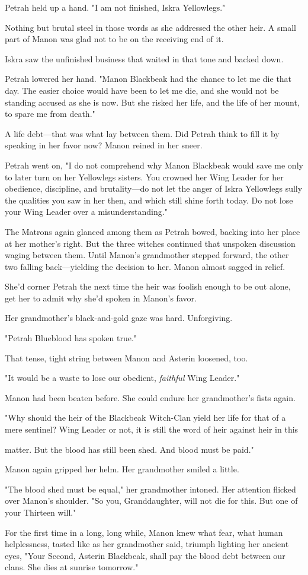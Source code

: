 Petrah held up a hand. "I am not finished, Iskra Yellowlegs."

Nothing but brutal steel in those words as she addressed the other heir. A small part of Manon was glad not to be on the receiving end of it.

Iskra saw the unfinished business that waited in that tone and backed down.

Petrah lowered her hand. "Manon Blackbeak had the chance to let me die that day. The easier choice would have been to let me die, and she would not be standing accused as she is now. But she risked her life, and the life of her mount, to spare me from death."

A life debt---that was what lay between them. Did Petrah think to fill it by speaking in her favor now? Manon reined in her sneer.

Petrah went on, "I do not comprehend why Manon Blackbeak would save me only to later turn on her Yellowlegs sisters. You crowned her Wing Leader for her obedience, discipline, and brutality---do not let the anger of Iskra Yellowlegs sully the qualities you saw in her then, and which still shine forth today. Do not lose your Wing Leader over a misunderstanding."

The Matrons again glanced among them as Petrah bowed, backing into her place at her mother's right. But the three witches continued that unspoken discussion waging between them. Until Manon's grandmother stepped forward, the other two falling back---yielding the decision to her. Manon almost sagged in relief.

She'd corner Petrah the next time the heir was foolish enough to be out alone, get her to admit why she'd spoken in Manon's favor.

Her grandmother's black-and-gold gaze was hard. Unforgiving.

"Petrah Blueblood has spoken true."

That tense, tight string between Manon and Asterin loosened, too.

"It would be a waste to lose our obedient, \emph{faithful} Wing Leader."

Manon had been beaten before. She could endure her grandmother's fists again.

"Why should the heir of the Blackbeak Witch-Clan yield her life for that of a mere sentinel? Wing Leader or not, it is still the word of heir against heir in this

matter. But the blood has still been shed. And blood must be paid."

Manon again gripped her helm. Her grandmother smiled a little.

"The blood shed must be equal," her grandmother intoned. Her attention flicked over Manon's shoulder. "So you, Granddaughter, will not die for this. But one of your Thirteen will."

For the first time in a long, long while, Manon knew what fear, what human helplessness, tasted like as her grandmother said, triumph lighting her ancient eyes, "Your Second, Asterin Blackbeak, shall pay the blood debt between our clans. She dies at sunrise tomorrow."
